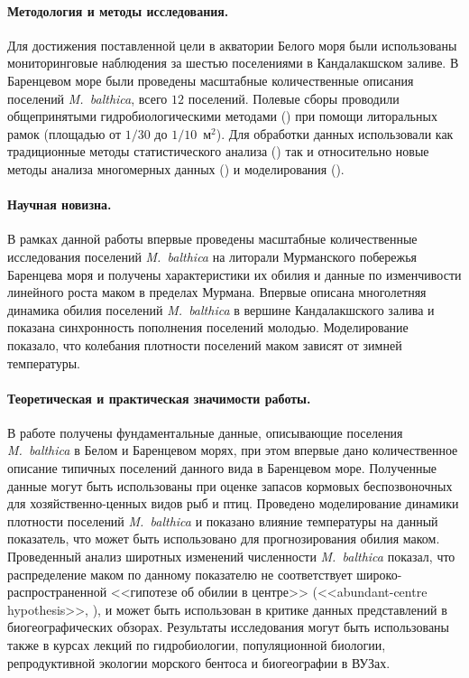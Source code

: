 \paragraph{Методология и методы исследования.}
Для достижения поставленной цели в акватории Белого моря были использованы мониторинговые наблюдения за шестью поселениями в Кандалакшском заливе.
В Баренцевом море были проведены масштабные количественные описания поселений {\it M.~balthica}, всего $12$ поселений.
Полевые сборы проводили общепринятыми гидробиологическими методами (\cite{Eleftheriou_2013}) при помощи литоральных рамок (площадью от $1/30$ до $1/10$~м$^2$).
Для обработки данных использовали как традиционные методы статистического анализа (\cite{Tukey_1977, Mardia_et_al_1979, Chambers_Hastie_1991, Legendre_Legendre_2012, Hollander_et_al_2013}) так и относительно новые методы анализа многомерных данных (\cite{Clarke_et_al_2008}) и моделирования (\cite{Berryman_Turchin_2001}).

\paragraph{Научная новизна.}
В рамках данной работы впервые проведены масштабные количественные исследования поселений \textit{M.~balthica} на литорали Мурманского побережья Баренцева моря и получены характеристики их обилия и данные по изменчивости линейного роста маком в пределах Мурмана.
Впервые описана многолетняя динамика обилия поселений \textit{M.~balthica} в вершине Кандалакшского залива и показана синхронность пополнения поселений молодью.
Моделирование показало, что колебания плотности поселений маком зависят от зимней температуры.

\paragraph{Теоретическая и практическая значимости работы.}
В работе получены фундаментальные данные, описывающие поселения \textit{M.~balthica} в Белом и Баренцевом морях, при этом впервые дано количественное описание типичных поселений данного вида в Баренцевом море. 
Полученные данные могут быть использованы при оценке запасов кормовых беспозвоночных для хозяйственно-ценных видов рыб и птиц.
Проведено моделирование динамики плотности поселений \textit{M.~balthica} и показано влияние температуры на данный показатель, что может быть использовано для прогнозирования обилия маком. 
Проведенный анализ широтных изменений численности \textit{M.~balthica} показал, что распределение маком по данному показателю не соответствует широко-распространенной  <<гипотезе об обилии в центре>> (<<abundant-centre hypothesis>>, \cite{Sagarin_et_al_2006}), и может быть использован в критике данных представлений в биогеографических обзорах.
Результаты исследования могут быть использованы также в курсах лекций по гидробиологии, популяционной биологии, репродуктивной экологии морского бентоса и биогеографии в ВУЗах.

